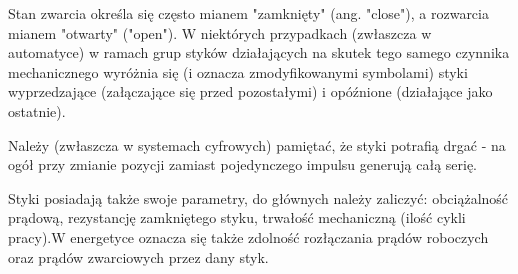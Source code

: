 Stan zwarcia określa się często mianem "zamknięty" (ang. "close"), a rozwarcia mianem "otwarty" ("open"). W niektórych przypadkach (zwłaszcza w automatyce) w ramach grup styków działających na skutek tego samego czynnika mechanicznego wyróżnia się (i oznacza zmodyfikowanymi symbolami) styki wyprzedzające (załączające się przed pozostałymi) i opóźnione (działające jako ostatnie).

Należy (zwłaszcza w systemach cyfrowych) pamiętać, że styki potrafią drgać - na ogół przy zmianie pozycji zamiast pojedynczego impulsu generują całą serię.

Styki posiadają także swoje parametry, do głównych należy zaliczyć: obciążalność prądową, rezystancję zamkniętego styku, trwałość mechaniczną (ilość cykli pracy).W energetyce oznacza się także zdolność rozłączania prądów roboczych oraz prądów zwarciowych przez dany styk.


